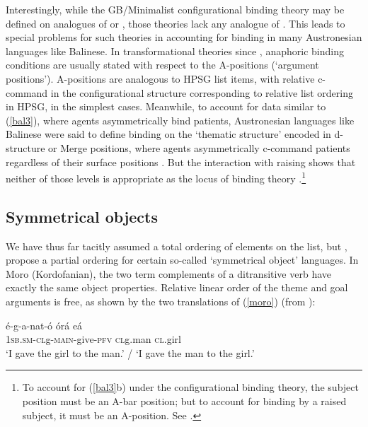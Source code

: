 \documentclass[output=paper]{langsci/langscibook}
\begin{document}
Interestingly, while the GB/Minimalist configurational binding theory may be defined on analogues of \val or \content,  those theories lack any analogue of \argst.  This leads to special problems for such theories in accounting for binding in many Austronesian languages like Balinese.  In transformational theories since \citet{Chomsky81a}, anaphoric binding conditions are usually stated with respect to the A-positions (`argument positions').  A-positions are analogous to HPSG \val list items, with relative c-command in the configurational structure corresponding to relative list ordering in HPSG, in the simplest cases.  Meanwhile, to account for data similar to (\ref{bal3}), where agents asymmetrically bind patients, Austronesian languages like Balinese were said to define binding on the `thematic structure' encoded in d-structure or Merge positions, where agents asymmetrically c-command patients regardless of their surface positions \citep{Guilfoyle+etal:1992}.  But the interaction with raising shows that neither of those levels is appropriate as the locus of binding theory \citep{Wechsler1999}.\footnote{To account for (\ref{bal3}b) under the configurational binding theory, the subject position must be an A-bar position; but to account for binding by a raised subject, it must be an A-position.  See \citet{Wechsler1999}. } 

\subsection{Symmetrical objects}
We have thus far tacitly assumed a total ordering of elements on the \argst list, but \citet{AMM2013a}, \citet{Ackermanetal2017} propose a partial ordering for certain so-called `symmetrical object' languages.  In Moro (Kordofanian), the two term complements of a ditransitive verb have exactly the same object properties.  Relative linear order of the theme and goal arguments is free, as shown by the two translations of (\ref{moro}) (from \citealt[9]{Ackermanetal2017}):


\begin{exe}
	\ex\label{moro}
\gll   \'{e}-g-a-nat-\'{o} \'{o}r\'{a}  e\'{a}  \\
        1\textsc{sb.sm-cl}g-\textsc{main}-give-\textsc{pfv}    \textsc{cl}g.man \textsc{cl}.girl \\
\glt `I gave the girl to the man.’ / `I gave the man to the girl.’
\end{exe} 
\end{document}
